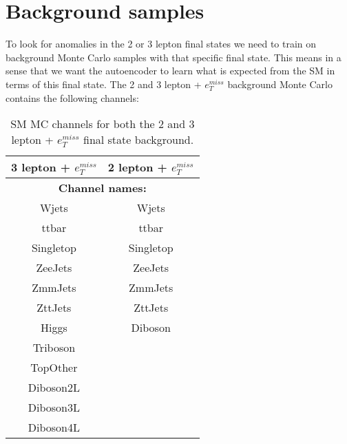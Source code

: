 \section{Background samples}

To look for anomalies in the 2 or 3 lepton final states we need to train on background Monte Carlo samples with that specific final state. 
This means in a sense that we want the autoencoder to learn what is expected from the SM in terms of this final state. 
The 2 and 3 lepton + $e_T^{miss}$ background Monte Carlo contains the following channels:

\begin{table}[H]
    \centering
    
    \begin{tabular}{|cc|}
    \hline
    \multicolumn{1}{|c|}{\textbf{3 lepton + $e_T^{miss}$}} & \textbf{2 lepton + $e_T^{miss}$} \\ \hline
    \multicolumn{2}{|c|}{\textbf{Channel names:}}                                             \\ \hline
    \multicolumn{1}{|c|}{Wjets}& Wjets                            \\ \hline
    \multicolumn{1}{|c|}{ttbar}& ttbar                            \\ \hline
    \multicolumn{1}{|c|}{Singletop}& Singletop                        \\ \hline
    \multicolumn{1}{|c|}{ZeeJets}  & ZeeJets                          \\ \hline
    \multicolumn{1}{|c|}{ZmmJets}                          & ZmmJets                          \\ \hline
    \multicolumn{1}{|c|}{ZttJets}                          & ZttJets                          \\ \hline
    \multicolumn{1}{|c|}{Higgs}                            & Diboson                          \\ \hline
    \multicolumn{1}{|c|}{Triboson}                         &                                  \\ \hline
    \multicolumn{1}{|c|}{TopOther}                         &                                  \\ \hline
    \multicolumn{1}{|c|}{Diboson2L}                        &                                  \\ \hline
    \multicolumn{1}{|c|}{Diboson3L}                        &                                  \\ \hline
    \multicolumn{1}{|c|}{Diboson4L}                        &                                  \\ \hline
\end{tabular}
\caption[SM MC channels]{SM MC channels for both the 2 and 3 lepton + $e_T^{miss}$ final state background. }
\label{tab:bkg_channels}
\end{table}


